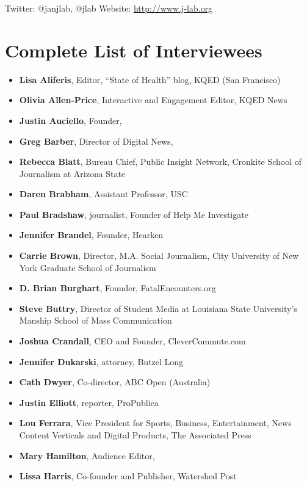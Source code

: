 \begin{itemize}
\begin{itemize}
Twitter: @janjlab, @jlab
Website: \href{http://www.j-lab.org }{http://www.j-lab.org} 


\chapter{Complete List of Interviewees} 

\begin{itemize}
\item \textbf{Lisa Aliferis}, Editor, ``State of Health'' blog, KQED (San Francisco)
\item \textbf{Olivia Allen-Price}, Interactive and Engagement Editor, KQED News
\item \textbf{Justin Auciello}, Founder, 
\item \textbf{Greg Barber}, Director of Digital News, 
\item \textbf{Rebecca Blatt}, Bureau Chief, Public Insight Network, Cronkite School of Journalism at Arizona State
\item \textbf{Daren Brabham}, Assistant Professor, USC
\item \textbf{Paul Bradshaw}, journalist, Founder of Help Me Investigate
\item \textbf{Jennifer Brandel}, Founder, Hearken
\item \textbf{Carrie Brown}, Director, M.A. Social Journalism, City University of New York Graduate School of Journalism
\item \textbf{D. Brian Burghart}, Founder, FatalEncounters.org
\item \textbf{Steve Buttry}, Director of Student Media at Louisiana State University’s Manship School of Mass Communication
\item \textbf{Joshua Crandall}, CEO and Founder, CleverCommute.com
\item \textbf{Jennifer Dukarski}, attorney, Butzel Long
\item \textbf{Cath Dwyer}, Co-director, ABC Open (Australia)
\item \textbf{Justin Elliott}, reporter, ProPublica
\item \textbf{Lou Ferrara}, Vice President for Sports, Business, Entertainment, News Content Verticals and Digital Products, The Associated Press
\item \textbf{Mary Hamilton}, Audience Editor, 
\item \textbf{Lissa Harris}, Co-founder and Publisher, Watershed Post 

\end{itemize}
\end{itemize}
\end{itemize}

